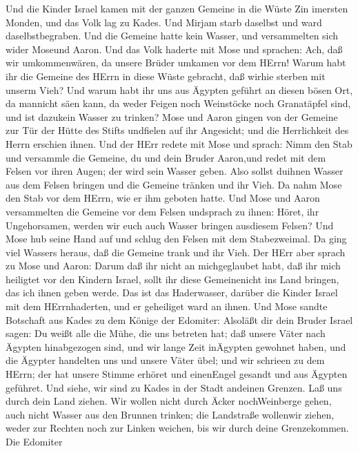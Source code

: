  Und die Kinder Israel kamen mit der ganzen Gemeine in die
Wüste Zin imersten Monden, und das Volk lag zu Kades. Und Mirjam starb
daselbst und ward daselbstbegraben.  Und die Gemeine hatte
kein Wasser, und versammelten sich wider Moseund Aaron.  Und
das Volk haderte mit Mose und sprachen: Ach, daß wir umkommenwären, da
unsere Brüder umkamen vor dem HErrn!  Warum habt ihr die
Gemeine des HErrn in diese Wüste gebracht, daß wirhie sterben mit unserm
Vieh?  Und warum habt ihr uns aus Ägypten geführt an diesen
bösen Ort, da mannicht säen kann, da weder Feigen noch Weinstöcke noch
Granatäpfel sind, und ist dazukein Wasser zu trinken?  Mose
und Aaron gingen von der Gemeine zur Tür der Hütte des Stifts undfielen
auf ihr Angesicht; und die Herrlichkeit des Herrn erschien ihnen.
 Und der HErr redete mit Mose und sprach:  Nimm
den Stab und versammle die Gemeine, du und dein Bruder Aaron,und redet
mit dem Felsen vor ihren Augen; der wird sein Wasser geben. Also sollst
duihnen Wasser aus dem Felsen bringen und die Gemeine tränken und ihr
Vieh.  Da nahm Mose den Stab vor dem HErrn, wie er ihm
geboten hatte.  Und Mose und Aaron versammelten die Gemeine
vor dem Felsen undsprach zu ihnen: Höret, ihr Ungehorsamen, werden wir
euch auch Wasser bringen ausdiesem Felsen?  Und Mose hub
seine Hand auf und schlug den Felsen mit dem Stabezweimal. Da ging viel
Wassers heraus, daß die Gemeine trank und ihr Vieh.  Der
HErr aber sprach zu Mose und Aaron: Darum daß ihr nicht an michgeglaubet
habt, daß ihr mich heiligtet vor den Kindern Israel, sollt ihr diese
Gemeinenicht ins Land bringen, das ich ihnen geben werde. 
Das ist das Haderwasser, darüber die Kinder Israel mit dem
HErrnhaderten, und er geheiliget ward an ihnen.  Und Mose
sandte Botschaft aus Kades zu dem Könige der Edomiter: Alsoläßt dir dein
Bruder Israel sagen: Du weißt alle die Mühe, die uns betreten hat;
 daß unsere Väter nach Ägypten hinabgezogen sind, und wir
lange Zeit inÄgypten gewohnet haben, und die Ägypter handelten uns und
unsere Väter übel;  und wir schrieen zu dem HErrn; der hat
unsere Stimme erhöret und einenEngel gesandt und aus Ägypten geführet.
Und siehe, wir sind zu Kades in der Stadt andeinen Grenzen.
 Laß uns durch dein Land ziehen. Wir wollen nicht durch
Äcker nochWeinberge gehen, auch nicht Wasser aus den Brunnen trinken;
die Landstraße wollenwir ziehen, weder zur Rechten noch zur Linken
weichen, bis wir durch deine Grenzekommen.  Die Edomiter

